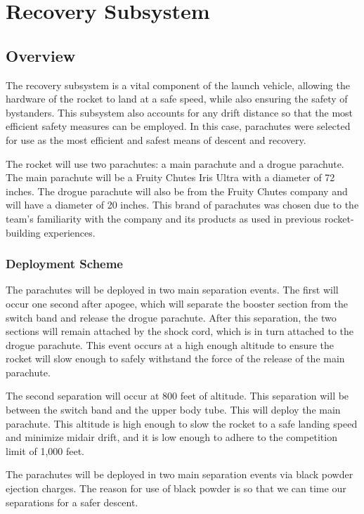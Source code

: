 \chapter{Recovery Subsystem}

\section{Overview}
The recovery subsystem is a vital component of the launch vehicle, allowing the hardware of the rocket to land at a safe speed, while also ensuring the safety of bystanders. This subsystem also accounts for any drift distance so that the most efficient safety measures can be employed. In this case, parachutes were selected for use as the most efficient and safest means of descent and recovery.

The rocket will use two parachutes: a main parachute and a drogue parachute. The main parachute will be a Fruity Chutes Iris Ultra with a diameter of 72 inches. The drogue parachute will also be from the Fruity Chutes company and will have a diameter of 20 inches. This brand of parachutes was chosen due to the team’s familiarity with the company and its products as used in previous rocket-building experiences.

    \subsection{Deployment Scheme}
The parachutes will be deployed in two main separation events. The first will occur one second after apogee, which will separate the booster section from the switch band and release the drogue parachute. After this separation, the two sections will remain attached by the shock cord, which is in turn attached to the drogue parachute. This event occurs at a high enough altitude to ensure the rocket will slow enough to safely withstand the force of the release of the main parachute.

The second separation will occur at 800 feet of altitude. This separation will be between the switch band and the upper body tube. This will deploy the main parachute. This altitude is high enough to slow the rocket to a safe landing speed and minimize midair drift, and it is low enough to adhere to the competition limit of 1,000 feet.
 
The parachutes will be deployed in two main separation events via black powder ejection charges. The reason for use of black powder is so that we can time our separations for a safer descent. 


